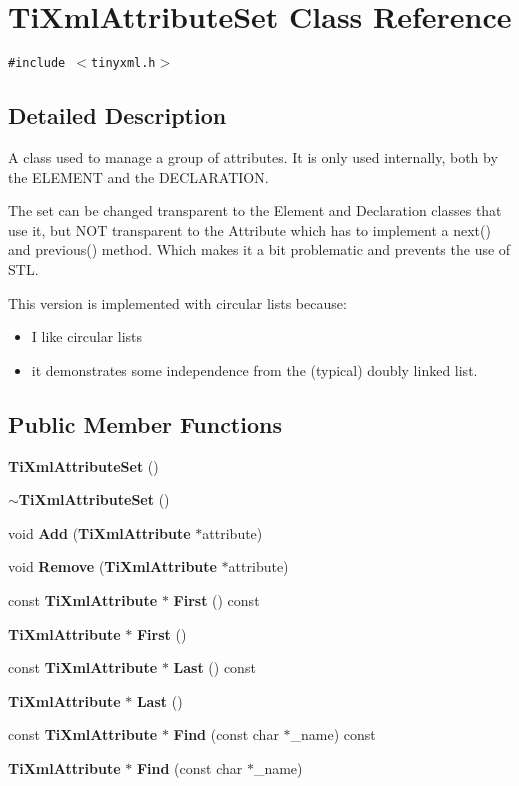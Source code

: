 \section{TiXmlAttributeSet Class Reference}
\label{classTiXmlAttributeSet}
{\tt \#include $<$tinyxml.h$>$}



\subsection{Detailed Description}
A class used to manage a group of attributes. It is only used internally, both by the ELEMENT and the DECLARATION.

The set can be changed transparent to the Element and Declaration classes that use it, but NOT transparent to the Attribute which has to implement a next() and previous() method. Which makes it a bit problematic and prevents the use of STL.

This version is implemented with circular lists because:\begin{itemize}
\item I like circular lists\item it demonstrates some independence from the (typical) doubly linked list. \end{itemize}
\subsection*{Public Member Functions}
\begin{CompactItemize}
\item 
{\bf TiXmlAttributeSet} ()
\item 
{\bf $\sim$TiXmlAttributeSet} ()
\item 
void {\bf Add} ({\bf TiXmlAttribute} $\ast$attribute)
\item 
void {\bf Remove} ({\bf TiXmlAttribute} $\ast$attribute)
\item 
const {\bf TiXmlAttribute} $\ast$ {\bf First} () const 
\item 
{\bf TiXmlAttribute} $\ast$ {\bf First} ()
\item 
const {\bf TiXmlAttribute} $\ast$ {\bf Last} () const 
\item 
{\bf TiXmlAttribute} $\ast$ {\bf Last} ()
\item 
const {\bf TiXmlAttribute} $\ast$ {\bf Find} (const char $\ast$\_\-name) const 
\item 
{\bf TiXmlAttribute} $\ast$ {\bf Find} (const char $\ast$\_\-name)
\end{CompactItemize}


